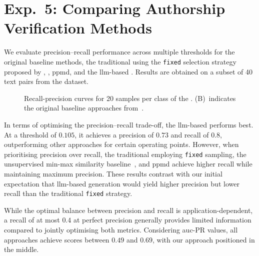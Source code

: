 \section{Exp.\ 5: Comparing Authorship Verification Methods}%
\label{sec:imp_gen_res}

We evaluate precision–recall performance across multiple thresholds for the original baseline methods, the traditional \impAppr{} using the \texttt{fixed} \imp{} selection strategy proposed by \citet{koppel_determining_2014}, \unmasking{}, \ac{ppmd}, and the \ac{llm}-based \impAppr{}.
Results are obtained on a subset of 40 text pairs from the \dataStudent{} dataset.

\begin{figure}[htbp]
    \centering
    
    \caption[Recall-precision curves for the \dataStudent{}]{
        Recall-precision curves for 20 samples per class of the \dataStudent{}. 
        (B)~indicates the original baseline approaches from~\citep{koppel_determining_2014}.
    }
    \label{fig:comp_naive_student}
\end{figure}

In terms of optimising the precision–recall trade-off, the \ac{llm}-based \impAppr{} performs best. 
At a threshold of $0.105$, it achieves a precision of $0.73$ and recall of $0.8$, outperforming other approaches for certain operating points. 
However, when prioritising precision over recall, the traditional \impAppr{} employing \texttt{fixed} \imp{} sampling, the unsupervised min-max similarity baseline~\citep{koppel_determining_2014}, and \ac{ppmd} achieve higher recall while maintaining maximum precision. These results contrast with our initial expectation that \ac{llm}-based \imp{} generation would yield higher precision but lower recall than the traditional \texttt{fixed} strategy.

While the optimal balance between precision and recall is application-dependent, a recall of at most $0.4$ at perfect precision generally provides limited information compared to jointly optimising both metrics. Considering \ac{auc}-PR values, all approaches achieve scores between $0.49$ and $0.69$, with our approach positioned in the middle.

